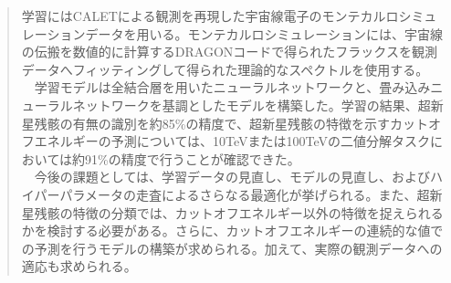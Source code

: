 \documentclass[a4paper,11truept]{ltjsreport}
\begin{document}
\begin{abstract}
学習にはCALETによる観測を再現した宇宙線電子のモンテカルロシミュレーションデータを用いる。モンテカルロシミュレーションには、宇宙線の伝搬を数値的に計算するDRAGONコード\cite{Gaggero2012}で得られたフラックスを観測データへフィッティングして得られた理論的なスペクトルを使用する。\\
　学習モデルは全結合層を用いたニューラルネットワークと、畳み込みニューラルネットワークを基調としたモデルを構築した。学習の結果、超新星残骸の有無の識別を約85\%の精度で、超新星残骸の特徴を示すカットオフエネルギーの予測については、10TeVまたは100TeVの二値分解タスクにおいては約91\%の精度で行うことが確認できた。\\
　今後の課題としては、学習データの見直し、モデルの見直し、およびハイパーパラメータの走査によるさらなる最適化が挙げられる。また、超新星残骸の特徴の分類では、カットオフエネルギー以外の特徴を捉えられるかを検討する必要がある。さらに、カットオフエネルギーの連続的な値での予測を行うモデルの構築が求められる。加えて、実際の観測データへの適応も求められる。
\end{abstract}
\clearpage

\pagestyle{fancy}
\setcounter{page}{1}
\tableofcontents %
\cleardoublepage

\listoffigures %
\cleardoublepage

\listoftables %
\cleardoublepage
\end{document}
